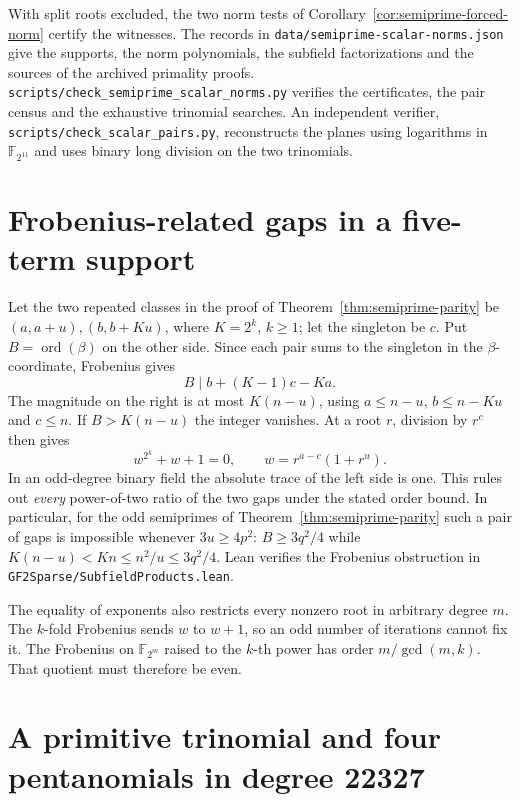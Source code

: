 \documentclass[11pt]{article}
\newcommand{\ord}{\operatorname{ord}}
\begin{document}
With split roots excluded, the two norm tests of
Corollary~\ref{cor:semiprime-forced-norm} certify the witnesses.
The records in \nolinkurl{data/semiprime-scalar-norms.json} give
the supports, the norm polynomials, the subfield factorizations and
the sources of the archived primality proofs.
\nolinkurl{scripts/check_semiprime_scalar_norms.py} verifies the
certificates, the pair census and the exhaustive trinomial searches.
An independent verifier, \nolinkurl{scripts/check_scalar_pairs.py},
reconstructs the planes using logarithms in \(\mathbb F_{2^{11}}\) and
uses binary long division on the two trinomials.

\clearpage
\section{Frobenius-related gaps in a five-term support}
\label{sec:dyadic-scalar-gaps}
Let the two repeated classes in the proof of
Theorem~\ref{thm:semiprime-parity} be
\((a,a+u),(b,b+Ku)\), where \(K=2^k\), \(k\ge1\); let the singleton
be \(c\). Put \(B=\ord(\beta)\) on the other side. Since each pair
sums to the singleton in the \(\beta\)-coordinate, Frobenius gives
\[
                B\mid b+(K-1)c-Ka .
\]
The magnitude on the right is at most \(K(n-u)\), using
\(a\le n-u\), \(b\le n-Ku\) and \(c\le n\). If \(B>K(n-u)\)
the integer vanishes. At a root \(r\), division by \(r^c\) then gives
\[
           w^{2^k}+w+1=0,\qquad w=r^{a-c}(1+r^u).
\]
In an odd-degree binary field the absolute trace of the left side is
one. This rules out \emph{every} power-of-two ratio of the two gaps
under the stated order bound. In particular, for the odd semiprimes
of Theorem~\ref{thm:semiprime-parity} such a pair of gaps is
impossible whenever \(3u\ge4p^2\):
\(B\ge3q^2/4\) while \(K(n-u)<Kn\le n^2/u\le3q^2/4\).
Lean verifies the Frobenius obstruction in
\nolinkurl{GF2Sparse/SubfieldProducts.lean}.

The equality of exponents also restricts every nonzero root in
arbitrary degree \(m\). The \(k\)-fold Frobenius sends \(w\) to \(w+1\),
so an odd number of iterations cannot fix it. The Frobenius on
\(\mathbb F_{2^m}\) raised to the \(k\)-th power has order
\(m/\gcd(m,k)\). That quotient must therefore be even.

\clearpage
\section{A primitive trinomial and four pentanomials in degree 22327}
\label{sec:semiprime-22327}
\end{document}
